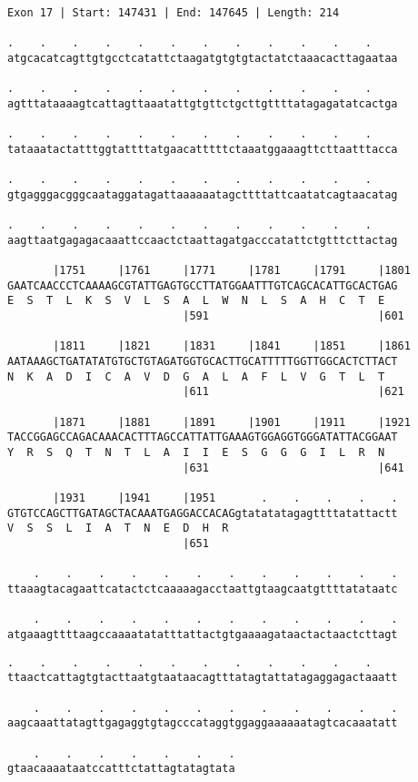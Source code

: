 \documentclass{article}
\begin{document}
\begin{Verbatim}[fontfamily=courier]
Exon 17 | Start: 147431 | End: 147645 | Length: 214

.    .    .    .    .    .    .    .    .    .    .    .    
atgcacatcagttgtgcctcatattctaagatgtgtgtactatctaaacacttagaataa

.    .    .    .    .    .    .    .    .    .    .    .    
agtttataaaagtcattagttaaatattgtgttctgcttgttttatagagatatcactga

.    .    .    .    .    .    .    .    .    .    .    .    
tataaatactatttggtattttatgaacatttttctaaatggaaagttcttaatttacca

.    .    .    .    .    .    .    .    .    .    .    .    
gtgagggacgggcaataggatagattaaaaaatagcttttattcaatatcagtaacatag

.    .    .    .    .    .    .    .    .    .    .    .    
aagttaatgagagacaaattccaactctaattagatgacccatattctgtttcttactag

       |1751     |1761     |1771     |1781     |1791     |1801
GAATCAACCCTCAAAAGCGTATTGAGTGCCTTATGGAATTTGTCAGCACATTGCACTGAG
E  S  T  L  K  S  V  L  S  A  L  W  N  L  S  A  H  C  T  E  
                           |591                          |601

       |1811     |1821     |1831     |1841     |1851     |1861
AATAAAGCTGATATATGTGCTGTAGATGGTGCACTTGCATTTTTGGTTGGCACTCTTACT
N  K  A  D  I  C  A  V  D  G  A  L  A  F  L  V  G  T  L  T  
                           |611                          |621

       |1871     |1881     |1891     |1901     |1911     |1921
TACCGGAGCCAGACAAACACTTTAGCCATTATTGAAAGTGGAGGTGGGATATTACGGAAT
Y  R  S  Q  T  N  T  L  A  I  I  E  S  G  G  G  I  L  R  N  
                           |631                          |641

       |1931     |1941     |1951       .    .    .    .    .
GTGTCCAGCTTGATAGCTACAAATGAGGACCACAGgtatatatagagttttatattactt
V  S  S  L  I  A  T  N  E  D  H  R                          
                           |651                             

    .    .    .    .    .    .    .    .    .    .    .    .
ttaaagtacagaattcatactctcaaaaagacctaattgtaagcaatgttttatataatc

    .    .    .    .    .    .    .    .    .    .    .    .
atgaaagttttaagccaaaatatatttattactgtgaaaagataactactaactcttagt

\end{Verbatim}
\newpage
\begin{Verbatim}[fontfamily=courier]
    .    .    .    .    .    .    .    .    .    .    .    .
ttaactcattagtgtacttaatgtaataacagtttatagtattatagaggagactaaatt

    .    .    .    .    .    .    .    .    .    .    .    .
aagcaaattatagttgagaggtgtagcccataggtggaggaaaaaatagtcacaaatatt

    .    .    .    .    .    .    .
gtaacaaaataatccatttctattagtatagtata
\end{Verbatim}
\end{document}
